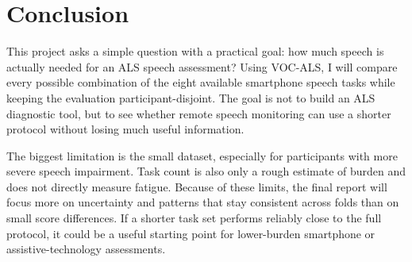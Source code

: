 \section{Conclusion}

This project asks a simple question with a practical goal: how much speech is actually needed for an ALS speech assessment? Using VOC-ALS, I will compare every possible combination of the eight available smartphone speech tasks while keeping the evaluation participant-disjoint. The goal is not to build an ALS diagnostic tool, but to see whether remote speech monitoring can use a shorter protocol without losing much useful information.

The biggest limitation is the small dataset, especially for participants with more severe speech impairment. Task count is also only a rough estimate of burden and does not directly measure fatigue. Because of these limits, the final report will focus more on uncertainty and patterns that stay consistent across folds than on small score differences. If a shorter task set performs reliably close to the full protocol, it could be a useful starting point for lower-burden smartphone or assistive-technology assessments.

